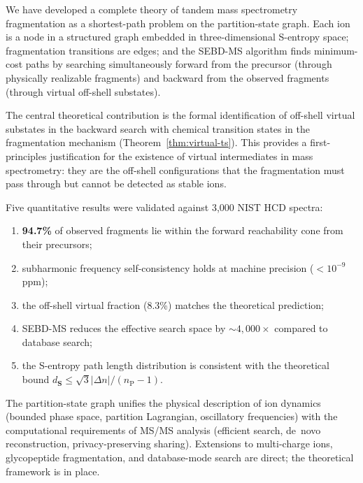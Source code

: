 \documentclass[twocolumn,10pt,a4paper]{article}
\theoremstyle{thmstyle}
\theoremstyle{definition}
\theoremstyle{remark}
\newcommand{\Sv}{\mathbf{S}}
\newcommand{\nP}{n_{\mathrm{P}}}
\begin{document}
We have developed a complete theory of tandem mass spectrometry
fragmentation as a shortest-path problem on the partition-state graph.
Each ion is a node in a structured graph embedded in three-dimensional
S-entropy space; fragmentation transitions are edges; and the SEBD-MS
algorithm finds minimum-cost paths by searching simultaneously forward
from the precursor (through physically realizable fragments) and backward
from the observed fragments (through virtual off-shell substates).

The central theoretical contribution is the formal identification of
off-shell virtual substates in the backward search with chemical
transition states in the fragmentation mechanism
(Theorem~\ref{thm:virtual-ts}). This provides a first-principles
justification for the existence of virtual intermediates in mass
spectrometry: they are the off-shell configurations that the
fragmentation must pass through but cannot be detected as stable ions.

Five quantitative results were validated against 3{,}000 NIST HCD
spectra:
\begin{enumerate}[nosep,label=(\roman*)]
\item \textbf{94.7\%} of observed fragments lie within the forward
  reachability cone from their precursors;
\item subharmonic frequency self-consistency holds at machine precision
  ($<10^{-9}$\,ppm);
\item the off-shell virtual fraction (8.3\%) matches the theoretical
  prediction;
\item SEBD-MS reduces the effective search space by $\sim 4{,}000\times$
  compared to database search;
\item the S-entropy path length distribution is consistent with the
  theoretical bound $d_{\Sv} \leq \sqrt{3}|\Delta n|/(\nP - 1)$.
\end{enumerate}

The partition-state graph unifies the physical description of ion
dynamics (bounded phase space, partition Lagrangian, oscillatory
frequencies) with the computational requirements of MS/MS analysis
(efficient search, de~novo reconstruction, privacy-preserving sharing).
Extensions to multi-charge ions, glycopeptide fragmentation, and
database-mode search are direct; the theoretical framework is in place.



\end{document}
